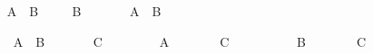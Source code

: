 \begin{isabellebody}
\begin{minipage}[t]{0.4\textwidth}
%
\isatagproof
{}\isamarkupfalse%
\ \isamarkupfalse%
\ {\isachardoublequoteopen}A\ {\isasymor}\ B{\isachardoublequoteclose}\ \isacommand{{\isachardot}{\isachardot}}\isamarkupfalse%
\isanewline
\isanewline
\ \ \isamarkupfalse%
\ B%
\endisatagproof
{\isafoldproof}%
%
\isadelimproof
%
\endisadelimproof
%
\isadelimnoproof
\ %
\endisadelimnoproof
%
\isatagnoproof
{}\isamarkupfalse%
%
\endisatagnoproof
{\isafoldnoproof}%
%
\isadelimnoproof
\isanewline
%
\endisadelimnoproof
%
\isadelimproof
\ \ %
\endisadelimproof
%
\isatagproof
{}\isamarkupfalse%
\ \isamarkupfalse%
\ {\isachardoublequoteopen}A\ {\isasymor}\ B{\isachardoublequoteclose}\ \isacommand{{\isachardot}{\isachardot}}\isamarkupfalse%
%
\end{minipage}\qquad\begin{minipage}[t]{0.4\textwidth}
\isanewline
\ \ \isamarkupfalse%
\ {\isachardoublequoteopen}A\ {\isasymor}\ B{\isachardoublequoteclose}%
\endisatagproof
{\isafoldproof}%
%
\isadelimproof
%
\endisadelimproof
%
\isadelimnoproof
\ %
\endisadelimnoproof
%
\isatagnoproof
{}\isamarkupfalse%
%
\endisatagnoproof
{\isafoldnoproof}%
%
\isadelimnoproof
\isanewline
%
\endisadelimnoproof
%
\isadelimproof
\ \ %
\endisadelimproof
%
\isatagproof
{}\isamarkupfalse%
\ \isamarkupfalse%
\ C\isanewline
\ \ \isamarkupfalse%
\isanewline
\ \ \ \ \isamarkupfalse%
\ A\isanewline
\ \ \ \ \isamarkupfalse%
\ \isamarkupfalse%
\ C%
\endisatagproof
{\isafoldproof}%
%
\isadelimproof
%
\endisadelimproof
%
\isadelimnoproof
\ %
\endisadelimnoproof
%
\isatagnoproof
{}\isamarkupfalse%
%
\endisatagnoproof
{\isafoldnoproof}%
%
\isadelimnoproof
\isanewline
%
\endisadelimnoproof
%
\isadelimproof
\ \ %
\endisadelimproof
%
\isatagproof
{}\isamarkupfalse%
\isanewline
\ \ \ \ \isamarkupfalse%
\ B\isanewline
\ \ \ \ \isamarkupfalse%
\ \isamarkupfalse%
\ C%
\endisatagproof
{\isafoldproof}%
%
\isadelimproof
%
\endisadelimproof
%
\isadelimnoproof
\ %
\endisadelimnoproof
%
\isatagnoproof
{}\isamarkupfalse%
%
\endisatagnoproof
{\isafoldnoproof}%
%
\isadelimnoproof
\isanewline
%
\endisadelimnoproof
%
\isadelimproof
\ \ %
\endisadelimproof
%
\isatagproof
{}\isamarkupfalse%
%
\end{minipage}\\[3ex]\begin{minipage}[t]{0.4\textwidth}

\end{minipage}
\end{isabellebody}
